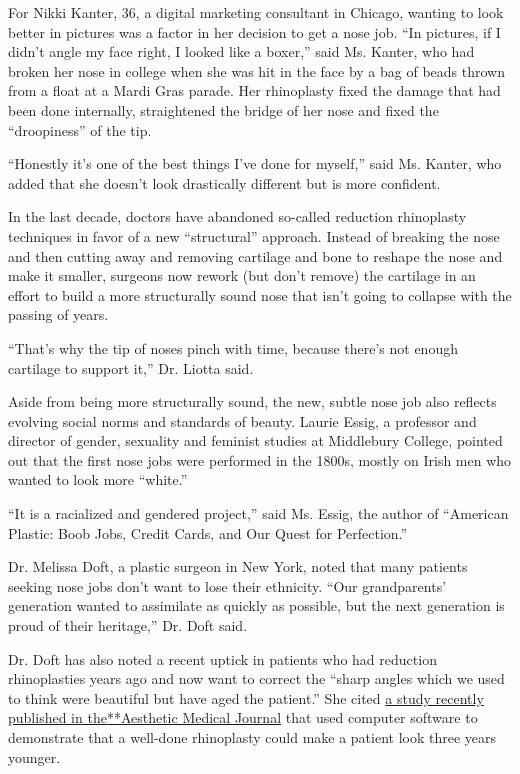 For Nikki Kanter, 36, a digital marketing consultant in Chicago, wanting
to look better in pictures was a factor in her decision to get a nose
job. ``In pictures, if I didn't angle my face right, I looked like a
boxer,'' said Ms. Kanter, who had broken her nose in college when she
was hit in the face by a bag of beads thrown from a float at a Mardi
Gras parade. Her rhinoplasty fixed the damage that had been done
internally, straightened the bridge of her nose and fixed the
``droopiness'' of the tip.

``Honestly it's one of the best things I've done for myself,'' said Ms.
Kanter, who added that she doesn't look drastically different but is
more confident.

In the last decade, doctors have abandoned so-called reduction
rhinoplasty techniques in favor of a new ``structural'' approach.
Instead of breaking the nose and then cutting away and removing
cartilage and bone to reshape the nose and make it smaller, surgeons now
rework (but don't remove) the cartilage in an effort to build a more
structurally sound nose that isn't going to collapse with the passing of
years.

``That's why the tip of noses pinch with time, because there's not
enough cartilage to support it,'' Dr. Liotta said.

Aside from being more structurally sound, the new, subtle nose job also
reflects evolving social norms and standards of beauty. Laurie Essig, a
professor and director of gender, sexuality and feminist studies at
Middlebury College, pointed out that the first nose jobs were performed
in the 1800s, mostly on Irish men who wanted to look more ``white.''

``It is a racialized and gendered project,'' said Ms. Essig, the author
of ``American Plastic: Boob Jobs, Credit Cards, and Our Quest for
Perfection.''

Dr. Melissa Doft, a plastic surgeon in New York, noted that many
patients seeking nose jobs don't want to lose their ethnicity. ``Our
grandparents' generation wanted to assimilate as quickly as possible,
but the next generation is proud of their heritage,'' Dr. Doft said.

Dr. Doft has also noted a recent uptick in patients who had reduction
rhinoplasties years ago and now want to correct the ``sharp angles which
we used to think were beautiful but have aged the patient.'' She cited
\href{https://academic.oup.com/asj/article-abstract/40/5/493/5648144?redirectedFrom=fulltext}{a
study recently published in
the}\href{https://academic.oup.com/asj/article-abstract/40/5/493/5648144?redirectedFrom=fulltext}{**}\href{https://academic.oup.com/asj/article-abstract/40/5/493/5648144?redirectedFrom=fulltext}{Aesthetic
Medical Journal} that used computer software to demonstrate that a
well-done rhinoplasty could make a patient look three years younger.

